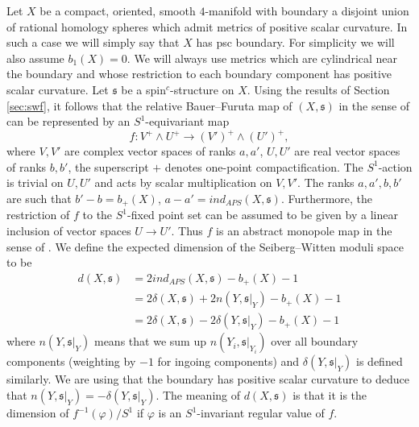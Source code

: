 \documentclass{amsart}
\theoremstyle{definition}
\theoremstyle{remark}
\numberwithin{equation}{section}
\begin{document}
Let $X$ be a compact, oriented, smooth $4$-manifold with boundary a disjoint union of rational homology spheres which admit metrics of positive scalar curvature. In such a case we will simply say that $X$ has psc boundary. For simplicity we will also assume $b_1(X) = 0$. We will always use metrics which are cylindrical near the boundary and whose restriction to each boundary component has positive scalar curvature. Let $\mathfrak{s}$ be a spin$^c$-structure on $X$. Using the results of Section \ref{sec:swf}, it follows that the relative Bauer--Furuta map of $(X , \mathfrak{s})$ in the sense of \cite{man1} can be represented by an $S^1$-equivariant map
\[
f : V^+ \wedge U^+ \to (V')^+ \wedge (U')^+,
\]
where $V,V'$ are complex vector spaces of ranks $a,a'$, $U,U'$ are real vector spaces of ranks $b,b'$, the superscript $+$ denotes one-point compactification. The $S^1$-action is trivial on $U,U'$ and acts by scalar multiplication on $V,V'$. The ranks $a,a',b,b'$ are such that $b'-b = b_+(X)$, $a-a' = ind_{APS}(X , \mathfrak{s})$. Furthermore, the restriction of $f$ to the $S^1$-fixed point set can be assumed to be given by a linear inclusion of vector spaces $U \to U'$. Thus $f$ is an abstract monopole map in the sense of \cite[Definition 2.1]{bar}. We define the expected dimension of the Seiberg--Witten moduli space to be
\begin{align*}
d(X , \mathfrak{s}) &= 2ind_{APS}(X,\mathfrak{s}) - b_+(X) - 1 \\
& =2 \delta(X , \mathfrak{s}) + 2 n(Y , \mathfrak{s}|_Y) - b_+(X) - 1 \\
& = 2 \delta(X , \mathfrak{s}) - 2 \delta(Y , \mathfrak{s}|_Y) - b_+(X) - 1
\end{align*}
where $n(Y, \mathfrak{s}|_Y)$ means that we sum up $n(Y_i , \mathfrak{s}|_{Y_i})$ over all boundary components (weighting by $-1$ for ingoing components) and $\delta(Y , \mathfrak{s}|_Y)$ is defined similarly. We are using that the boundary has positive scalar curvature to deduce that $n(Y , \mathfrak{s}|_Y) = -\delta(Y , \mathfrak{s}|_Y)$. The meaning of $d(X,\mathfrak{s})$ is that it is the dimension of $f^{-1}(\varphi)/S^1$ if $\varphi$ is an $S^1$-invariant regular value of $f$.
\end{document}
